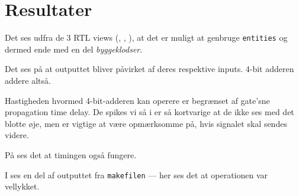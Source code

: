 \section{Resultater}


Det ses udfra de 3 RTL views (, , ), at det er muligt at genbruge \texttt{entities} og dermed ende med en del \textit{byggeklodser}.



Det ses på  at outputtet bliver påvirket af deres respektive inputs. 4-bit adderen addere altså.

Hastigheden hvormed 4-bit-adderen kan operere er begrænset af gate'sne propagation time delay. De spikes vi så i  er så kortvarige at de ikke ses med det blotte øje, men er vigtige at være opmærksomme på, hvis signalet skal sendes videre.

På  ses det at timingen også fungere.

I  ses en del af outputtet fra \texttt{makefilen} ---
her ses det at operationen var vellykket.

